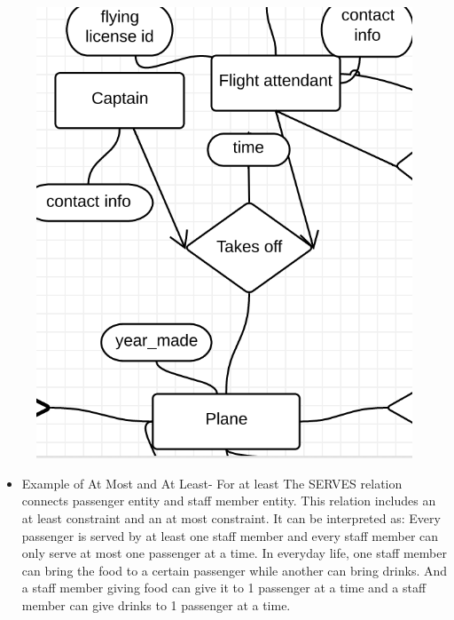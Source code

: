\documentclass[10pt,conference]{IEEEtran}
\begin{document}
\begin{figure}
\centering
\includegraphics[scale=0.5]{ternary.png}
\end{figure}



\newpage\begin{itemize} \item{
Example of At Most and At Least-  For at least The SERVES relation connects passenger entity and staff member entity. This relation includes an at least constraint and an at most constraint. It can be interpreted as:
Every passenger is served by at least one staff member and every staff member can only serve at most one passenger at a time. In everyday life, one staff member can bring the food to a certain passenger while another can bring drinks. And a staff member giving food can give it to 1 passenger at a time and a staff member can give drinks to 1 passenger at a time.} \end{itemize} 
\end{document}

